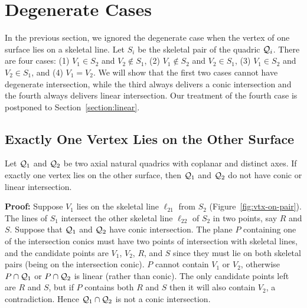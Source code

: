 
\section{Degenerate Cases}
\label{section:degen}

     In the previous section, we ignored the degenerate case when the vertex
of one surface lies on a skeletal line.
Let $S_i$ be the skeletal pair of the quadric ${\cal Q}_i$.
There are four cases:
(1) $V_1\in S_2$ and $V_2\not\in S_1$, (2) $V_1\not\in S_2$
and $V_2\in S_1$, (3) $V_1\in S_2$ and $V_2\in S_1$, and (4) $V_1=V_2$.
We will show that
the first two cases cannot have degenerate intersection, while the third
always delivers a conic intersection and the fourth always delivers
linear intersection.
Our treatment of the fourth case is postponed to
Section~\ref{section:linear}.



\subsection{Exactly One Vertex Lies on the Other Surface}
\label{section:exactly-one}

\begin{lemma}
\label{lemma:one-vtx-on-surface}
     Let ${\cal Q}_1$ and ${\cal Q}_2$ be two axial natural quadrics with
coplanar  and distinct axes.  If exactly one vertex lies on the other surface,
then ${\cal Q}_1$ and ${\cal Q}_2$ do not have conic or linear intersection.
\end{lemma}
{\bf Proof:}
Suppose $V_1$ lies on the skeletal line $\ell_{21}$ from $S_2$
(Figure~\ref{fig:vtx-on-pair}).
The lines of $S_1$ intersect the other skeletal line $\ell_{22}$ of $S_2$
in two points, say $R$ and $S$.
Suppose that ${\cal Q}_1$ and ${\cal Q}_2$ have conic intersection.
The plane $P$ containing one of the intersection conics must have two points
of intersection with skeletal lines, and the candidate points are
$V_1$, $V_2$, $R$, and $S$ since they must lie on both skeletal pairs
(being on the intersection conic).
$P$ cannot contain $V_1$ or $V_2$, otherwise $P \cap {\cal Q}_1$
or $P \cap {\cal Q}_2$ is linear (rather than conic).
The only candidate points left are $R$ and $S$, but if $P$ contains both
$R$ and $S$ then it will also contain $V_2$, a contradiction.
Hence ${\cal Q}_1\cap {\cal Q}_2$ is not a conic intersection.

